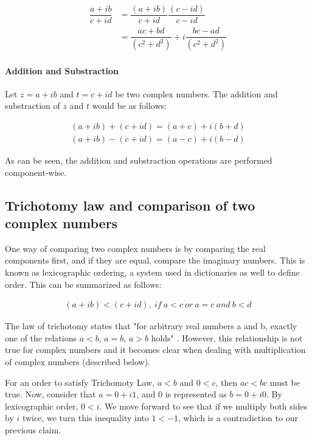\begin{equation}
\begin{aligned}
\dfrac{a+ib}{c+id} &= \dfrac{(a+ib)}{c+id}\dfrac{(c-id)}{c-id}\\
&= \dfrac{ac+bd}{(c^2+d^2)}+i\dfrac{bc-ad}{(c^2+d^2)}
\end{aligned}
\end{equation}

\paragraph{Addition and Substraction}
Let $z = a+ib$ and $t=c+id$ be two complex numbers. The addition and substraction of $z$ and $t$ would be as follows:

\begin{equation}
\begin{aligned}
(a+ib) + (c+id)  = (a+c)+i(b+d)\\
(a+ib) - (c+id)  = (a-c)+i(b-d)
\end{aligned}
\end{equation}

As can be seen, the addition and substraction operations are performed 
component-wise.

\subsection{Trichotomy law and comparison of two complex numbers}
One way of comparing two complex numbers is by comparing the real components first, and if they are equal, compare the imaginary numbers. This is known as lexicographic ordering, a system used in dictionaries as well to define order. This can be summarized as follows:

\begin{equation}
\begin{aligned}
(a+ib) < (c+id), \ if \ a<c \ or \ a=c \ and \ b<d
\end{aligned}
\end{equation}

The law of trichotomy states that "for arbitrary real numbers a and b, exactly one of the relations $a<b$, $a=b$, $a>b$ holds" \cite{trichotomy}. However, this relationship is not true for complex numbers and it becomes clear when dealing with multiplication of complex numbers (described below).

For an order to satisfy Trichomoty Law, $a<b$ and $0<c$, then $ac<bc$ must be true. Now, consider that $a=0+i1$, and $0$ is represented as $b=0+i0$. By lexicographic order, $0<i$. We move forward to see that if we multiply both sides by $i$ twice, we turn this inequality into $1<-1$, which is a contradiction to our previous claim.

